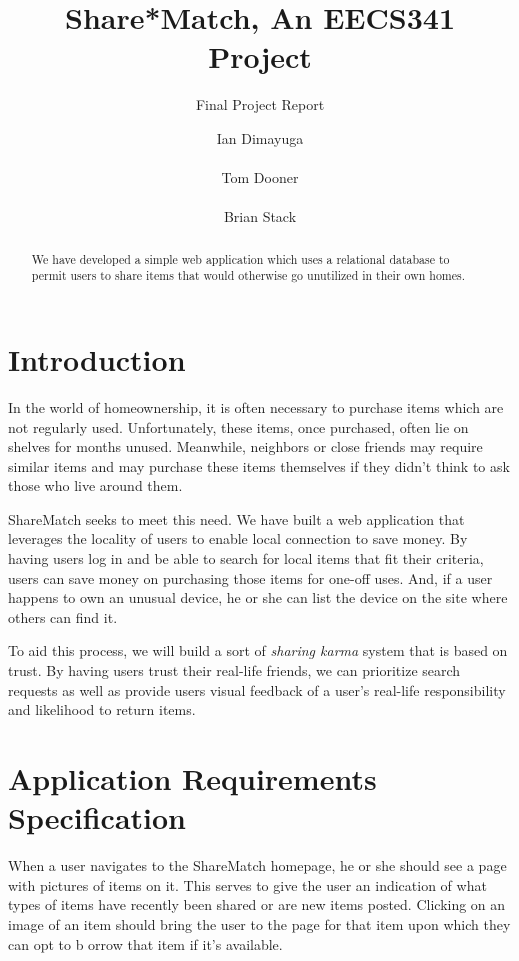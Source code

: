 \documentclass{acm_proc_article-sp}
\begin{document}
\title{Share*Match, An EECS341 Project}
\subtitle{Final Project Report}
\author{
\alignauthor Ian Dimayuga \\
    \\
\alignauthor Tom Dooner \\
    \\
\alignauthor Brian Stack \\
}
\maketitle
\begin{abstract}
We have developed a simple web application which uses a relational database to permit users to share items that would otherwise go unutilized in their own homes.
\end{abstract}

\section{Introduction}
In the world of homeownership, it is often necessary to purchase items which are not regularly used. 
Unfortunately, these items, once purchased, often lie on shelves for months unused. 
Meanwhile, neighbors or close friends may require similar items and may purchase these items themselves if they didn't think to ask those who live around them.

ShareMatch seeks to meet this need. We have built a web application that leverages the locality of users to 
enable local connection to save money. By having users log in and be able to search for local items that fit 
their criteria, users can save money on purchasing those items for one-off uses. And, if a user happens to own 
an unusual device, he or she can list the device on the site where others can find it.

To aid this process, we will build a sort of \textit{sharing karma} system that is based on trust. 
By having users trust their real-life friends, we can prioritize search requests as well as provide 
users visual feedback of a user's real-life responsibility and likelihood to return items.

\section{Application Requirements Specification}
When a user navigates to the ShareMatch homepage, he or she should see a page with pictures of items on it.
This serves to give the user an indication of what types of items have recently been shared or are new items posted. 
Clicking on an image of an item should bring the user to the page for that item upon which they can opt to b
orrow that item if it's available.
\end{document}

